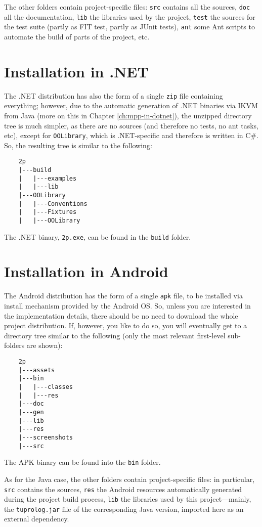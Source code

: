 The other folders contain project-specific files: \texttt{src} contains all the sources, \texttt{doc} all the documentation, \texttt{lib} the libraries used by the \tuprolog{} project, \texttt{test} the sources for the \tuprolog{} test suite (partly as FIT test, partly as JUnit tests), \texttt{ant} some Ant scripts to automate the build of parts of the \tuprolog{} project, etc.


\section{Installation in .NET}

The .NET distribution has also the form of a single \texttt{zip} file containing everything; however, due to the automatic generation of \tuprolog{} .NET binaries via IKVM from Java (more on this in Chapter \ref{ch:mpp-in-dotnet}), the unzipped directory tree is much simpler, as there are no sources (and therefore no tests, no ant tasks, etc), except for \texttt{OOLibrary}, which is .NET-specific and therefore is written in C\#.
%
So, the resulting tree is similar to the following:
%
\begin{verbatim}
    2p
    |---build
    |   |---examples
    |   |---lib
    |---OOLibrary
    |   |---Conventions
    |   |---Fixtures
    |   |---OOLibrary
\end{verbatim}
%
The .NET binary, \texttt{2p.exe}, can be found in the \texttt{build} folder.


\section{Installation in Android}

The Android distribution has the form of a single \texttt{apk} file, to be installed via install mechanism provided by the Android OS.
So, unless you are interested in the implementation details, there should be no need to download the whole project distribution.
If, however, you like to do so, you will eventually get to a directory tree similar to the following (only the most relevant first-level sub-folders are shown):
%
\begin{verbatim}
    2p
    |---assets
    |---bin
    |   |---classes
    |   |---res
    |---doc
    |---gen
    |---lib
    |---res
    |---screenshots
    |---src
\end{verbatim}
%
The APK binary can be found into the \texttt{bin} folder.

As for the Java case, the other folders contain project-specific files: in particular, \texttt{src} contains the sources, \texttt{res} the Android resources automatically generated during the project build process, \texttt{lib} the libraries used by this project---mainly, the \texttt{tuprolog.jar} file of the corresponding Java version, imported here as an external dependency.


